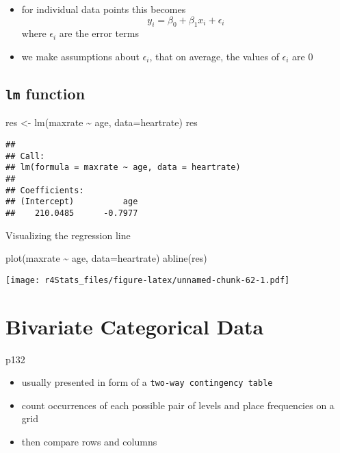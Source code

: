 \documentclass[
]{book}
\newenvironment{Shaded}{\begin{snugshade}}{\end{snugshade}}
\newcommand{\AttributeTok}[1]{\textcolor[rgb]{0.77,0.63,0.00}{#1}}
\newcommand{\FunctionTok}[1]{\textcolor[rgb]{0.00,0.00,0.00}{#1}}
\newcommand{\NormalTok}[1]{#1}
\newcommand{\OtherTok}[1]{\textcolor[rgb]{0.56,0.35,0.01}{#1}}
\newcommand{\SpecialCharTok}[1]{\textcolor[rgb]{0.00,0.00,0.00}{#1}}
\providecommand{\tightlist}{%
  \setlength{\itemsep}{0pt}\setlength{\parskip}{0pt}}
\theoremstyle{definition}
\theoremstyle{definition}
\theoremstyle{definition}
\theoremstyle{definition}
\theoremstyle{remark}
\begin{document}
\begin{itemize}
\tightlist
\item
  for individual data points this becomes
  \[
  y_i=\beta_0+\beta_1x_i+\epsilon_i 
  \]
  where \(\epsilon_i\) are the error terms
\item
  we make assumptions about \(\epsilon_i\), that on average, the values of \(\epsilon_i\) are 0
\end{itemize}

\hypertarget{lm-function}{%
\subsection{\texorpdfstring{\texttt{lm} function}{lm function}}\label{lm-function}}

\begin{Shaded}
\begin{Highlighting}[]
\NormalTok{res }\OtherTok{\textless{}{-}} \FunctionTok{lm}\NormalTok{(maxrate }\SpecialCharTok{\textasciitilde{}}\NormalTok{ age, }\AttributeTok{data=}\NormalTok{heartrate)}
\NormalTok{res}
\end{Highlighting}
\end{Shaded}

\begin{verbatim}
## 
## Call:
## lm(formula = maxrate ~ age, data = heartrate)
## 
## Coefficients:
## (Intercept)          age  
##    210.0485      -0.7977
\end{verbatim}

Visualizing the regression line

\begin{Shaded}
\begin{Highlighting}[]
\FunctionTok{plot}\NormalTok{(maxrate }\SpecialCharTok{\textasciitilde{}}\NormalTok{ age, }\AttributeTok{data=}\NormalTok{heartrate)}
\FunctionTok{abline}\NormalTok{(res)}
\end{Highlighting}
\end{Shaded}

\texttt{[image: r4Stats\_files/figure-latex/unnamed-chunk-62-1.pdf]}

\hypertarget{bivariate-categorical-data}{%
\section{Bivariate Categorical Data}\label{bivariate-categorical-data}}

p132

\begin{itemize}
\tightlist
\item
  usually presented in form of a \texttt{two-way\ contingency\ table}
\item
  count occurrences of each possible pair of levels and place frequencies on a grid
\item
  then compare rows and columns
\end{itemize}
\end{document}
